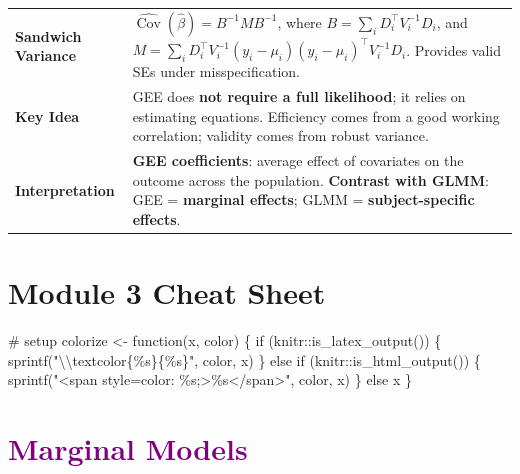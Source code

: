 \documentclass[
  letterpaper,
  DIV=11,
  numbers=noendperiod]{scrreprt}
\newenvironment{Shaded}{\begin{snugshade}}{\end{snugshade}}
\newcommand{\CommentTok}[1]{\textcolor[rgb]{0.37,0.37,0.37}{#1}}
\newcommand{\ControlFlowTok}[1]{\textcolor[rgb]{0.00,0.23,0.31}{#1}}
\newcommand{\FunctionTok}[1]{\textcolor[rgb]{0.28,0.35,0.67}{#1}}
\newcommand{\NormalTok}[1]{\textcolor[rgb]{0.00,0.23,0.31}{#1}}
\newcommand{\OtherTok}[1]{\textcolor[rgb]{0.00,0.23,0.31}{#1}}
\newcommand{\SpecialCharTok}[1]{\textcolor[rgb]{0.37,0.37,0.37}{#1}}
\newcommand{\StringTok}[1]{\textcolor[rgb]{0.13,0.47,0.30}{#1}}
\begin{document}
\begin{longtable}[]{@{}
  >{\raggedright\arraybackslash}p{}
  >{\raggedright\arraybackslash}p{}@{}}
\textbf{Sandwich Variance} &
\(\widehat{\operatorname{Cov}}(\hat{\beta}) = B^{-1} M B^{-1}\), where
\(B = \sum_i D_i^\top V_i^{-1} D_i\), and
\(M = \sum_i D_i^\top V_i^{-1}(y_i-\mu_i)(y_i-\mu_i)^\top V_i^{-1} D_i\).
Provides valid SEs under misspecification. \\
\textbf{Key Idea} & GEE does \textbf{not require a full likelihood}; it
relies on estimating equations. Efficiency comes from a good working
correlation; validity comes from robust variance. \\
\textbf{Interpretation} & \textbf{GEE coefficients}: average effect of
covariates on the outcome across the population. \textbf{Contrast with
GLMM}: GEE = \textbf{marginal effects}; GLMM = \textbf{subject-specific
effects}. \\
\end{longtable}


\hypertarget{module-3-cheat-sheet}{%
\chapter*{Module 3 Cheat Sheet}\label{module-3-cheat-sheet}}


\begin{Shaded}
\begin{Highlighting}[]
\CommentTok{\# setup}
\NormalTok{colorize }\OtherTok{\textless{}{-}} \ControlFlowTok{function}\NormalTok{(x, color) \{}
  \ControlFlowTok{if}\NormalTok{ (knitr}\SpecialCharTok{::}\FunctionTok{is\_latex\_output}\NormalTok{()) \{}
    \FunctionTok{sprintf}\NormalTok{(}\StringTok{"}\SpecialCharTok{\textbackslash{}\textbackslash{}}\StringTok{textcolor\{\%s\}\{\%s\}"}\NormalTok{, color, x)}
\NormalTok{  \} }\ControlFlowTok{else} \ControlFlowTok{if}\NormalTok{ (knitr}\SpecialCharTok{::}\FunctionTok{is\_html\_output}\NormalTok{()) \{}
    \FunctionTok{sprintf}\NormalTok{(}\StringTok{"\textless{}span style=\textquotesingle{}color: \%s;\textquotesingle{}\textgreater{}\%s\textless{}/span\textgreater{}"}\NormalTok{, color, x)}
\NormalTok{  \} }\ControlFlowTok{else}\NormalTok{ x}
\NormalTok{\}}
\end{Highlighting}
\end{Shaded}


\hypertarget{section-18}{%
\chapter*{\texorpdfstring{\textcolor{purple}{Marginal Models}}{}}\label{section-18}}
\end{document}
